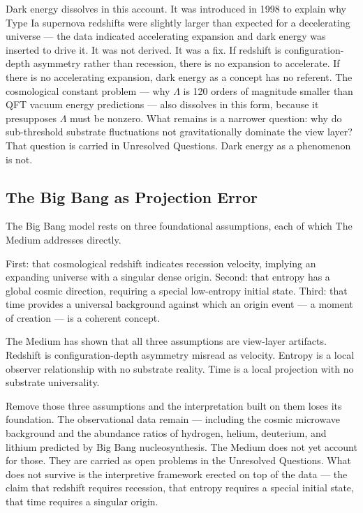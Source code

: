 \documentclass[11pt,letterpaper]{article}
\begin{document}
Dark energy dissolves in this account. It was introduced in 1998 to explain why Type Ia supernova redshifts were slightly larger than expected for a decelerating universe --- the data indicated accelerating expansion and dark energy was inserted to drive it. It was not derived. It was a fix. If redshift is configuration-depth asymmetry rather than recession, there is no expansion to accelerate. If there is no accelerating expansion, dark energy as a concept has no referent. The cosmological constant problem --- why \(\Lambda\) is 120 orders of magnitude smaller than QFT vacuum energy predictions --- also dissolves in this form, because it presupposes \(\Lambda\) must be nonzero. What remains is a narrower question: why do sub-threshold substrate fluctuations not gravitationally dominate the view layer? That question is carried in Unresolved Questions. Dark energy as a phenomenon is not.

\subsection{The Big Bang as Projection Error}
\label{sec:org8548bc5}

The Big Bang model rests on three foundational assumptions, each of which The Medium addresses directly.

First: that cosmological redshift indicates recession velocity, implying an expanding universe with a singular dense origin. Second: that entropy has a global cosmic direction, requiring a special low-entropy initial state. Third: that time provides a universal background against which an origin event --- a moment of creation --- is a coherent concept.

The Medium has shown that all three assumptions are view-layer artifacts. Redshift is configuration-depth asymmetry misread as velocity. Entropy is a local observer relationship with no substrate reality. Time is a local projection with no substrate universality.

Remove those three assumptions and the interpretation built on them loses its foundation. The observational data remain --- including the cosmic microwave background and the abundance ratios of hydrogen, helium, deuterium, and lithium predicted by Big Bang nucleosynthesis. The Medium does not yet account for those. They are carried as open problems in the Unresolved Questions. What does not survive is the interpretive framework erected on top of the data --- the claim that redshift requires recession, that entropy requires a special initial state, that time requires a singular origin.
\end{document}
